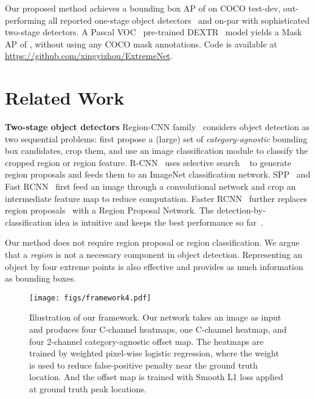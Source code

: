 \documentclass[10pt,twocolumn,letterpaper]{article}
\begin{document}
Our proposed method achieves a bounding box AP of  on COCO test-dev, out-performing all reported one-stage object detectors~\cite{lin2018focal,zhang2018single,redmon2018yolov3,Law_2018_ECCV} and on-par with sophisticated two-stage detectors.
A Pascal VOC~\cite{pascal-voc-2012,BharathICCV2011} pre-trained DEXTR~\cite{Man+18} model yields a Mask AP of , without using any COCO mask annotations. 
Code is available at \url{https://github.com/xingyizhou/ExtremeNet}. 

\section{Related Work}

\textbf{Two-stage object detectors} 
Region-CNN family~\cite{girshick2014rich,he2014spatial,girshick2015fast,ren2015faster,he2017mask} considers object detection as two sequential problems: first propose a (large) set of \emph{category-agnostic} bounding box candidates, crop them, and use an image classification module to classify the cropped region or region feature.
R-CNN~\cite{girshick2014rich} uses selective search ~\cite{uijlings2013selective} to generate region proposals and feeds them to an ImageNet classification network. 
SPP~\cite{he2014spatial} and Fast RCNN~\cite{girshick2015fast} first feed an image through a convolutional network and crop an intermediate feature map to reduce computation.
Faster RCNN~\cite{ren2015faster} further replaces region proposals~\cite{uijlings2013selective} with a Region Proposal Network.
The detection-by-classification idea is intuitive and keeps the best performance so far~\cite{dai2016r,Dai_2017_ICCV,peng2017megdet,liu2018path,lin2017feature,zhu2017couplenet,huang2017speed,tychsen2017improving,tychsen2017denet,Jiang_2018_ECCV}.


Our method does not require region proposal or region classification. 
We argue that a \emph{region} is not a necessary component in object detection. 
Representing an object by four extreme points is also effective and provides as much information as bounding boxes.


\begin{figure*}[t]
\begin{center}
\texttt{[image: figs/framework4.pdf]}
\vspace{-1em}
\end{center}
   \caption{Illustration of our framework. Our network takes an image as input and produces four C-channel heatmaps, one C-channel heatmap, and four 2-channel category-agnostic offset map. The heatmaps are trained by weighted pixel-wise logistic regression, where the weight is used to reduce false-positive penalty near the ground truth location. And the offset map is trained with Smooth L1 loss applied at ground truth peak locations.}
\label{fig:framework}
\end{figure*}
\end{document}
